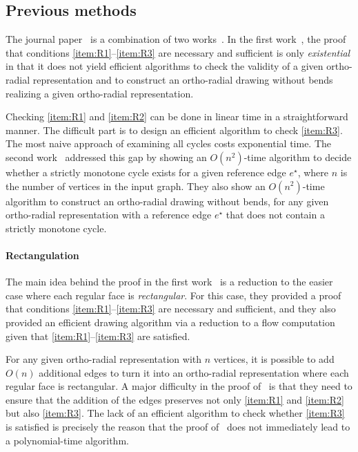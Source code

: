 \documentclass{theoretics}
\newcommand{\eref}{e^\star}
\begin{document}
\subsection{Previous methods}
The journal paper~\cite{barth2023topology} is a combination of two works~\cite{barth2017,niedermann19}.
In the first work~\cite{barth2017}, the proof that conditions \ref{item:R1}--\ref{item:R3} are necessary and sufficient is only \emph{existential} in that it does not yield efficient algorithms to check the {validity} of a given ortho-radial representation and to construct an ortho-radial drawing without bends realizing a given ortho-radial representation.

Checking \ref{item:R1} and \ref{item:R2} can be done in linear time in a straightforward manner. The difficult part is to design an efficient algorithm to check \ref{item:R3}. The most naive approach of examining all cycles costs exponential time. 
The second work~\cite{niedermann19} addressed this gap by showing an $O(n^2)$-time algorithm to decide whether a strictly monotone cycle exists for a given reference edge $\eref$, where $n$ is the number of vertices in the input graph. They also show an $O(n^2)$-time algorithm to construct an ortho-radial drawing without bends, for any given ortho-radial representation with a reference edge $\eref$ that does not contain a strictly monotone cycle.

\paragraph{Rectangulation}
The main idea behind the proof in the first work~\cite{barth2017} is a reduction to the easier case where each regular face is \emph{rectangular}. For this case, they provided a proof that conditions \ref{item:R1}--\ref{item:R3} are necessary and sufficient, and they also provided an efficient drawing algorithm via a reduction to a flow computation given that \ref{item:R1}--\ref{item:R3} are satisfied. 

For any given ortho-radial representation with $n$ vertices, it is possible to add $O(n)$ additional edges to turn it into an ortho-radial representation where each regular face is rectangular. A major difficulty in the proof of~\cite{barth2017} is that they need to ensure that the addition of the edges preserves not only \ref{item:R1} and \ref{item:R2} but also \ref{item:R3}.
The lack of an efficient algorithm to check whether \ref{item:R3} is satisfied is precisely the reason that the proof of~\cite{barth2017} does not immediately lead to a polynomial-time algorithm. 
\end{document}
